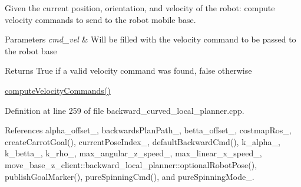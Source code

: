 Given the current position, orientation, and velocity of the robot\+: compute velocity commands to send to the robot mobile base. 


\begin{DoxyParams}{Parameters}
{\em cmd\+\_\+vel} & Will be filled with the velocity command to be passed to the robot base \\
\hline
\end{DoxyParams}
\begin{DoxyReturn}{Returns}
True if a valid velocity command was found, false otherwise
\end{DoxyReturn}
\hyperlink{classmove__base__z__client_1_1backward__local__planner_1_1BackwardLocalPlanner_a8e7dec0bc31856d814d8fa6df747bbb8}{compute\+Velocity\+Commands()} 

Definition at line 259 of file backward\+\_\+curved\+\_\+local\+\_\+planner.\+cpp.



References alpha\+\_\+offset\+\_\+, backwards\+Plan\+Path\+\_\+, betta\+\_\+offset\+\_\+, costmap\+Ros\+\_\+, create\+Carrot\+Goal(), current\+Pose\+Index\+\_\+, default\+Backward\+Cmd(), k\+\_\+alpha\+\_\+, k\+\_\+betta\+\_\+, k\+\_\+rho\+\_\+, max\+\_\+angular\+\_\+z\+\_\+speed\+\_\+, max\+\_\+linear\+\_\+x\+\_\+speed\+\_\+, move\+\_\+base\+\_\+z\+\_\+client\+::backward\+\_\+local\+\_\+planner\+::optional\+Robot\+Pose(), publish\+Goal\+Marker(), pure\+Spinning\+Cmd(), and pure\+Spinning\+Mode\+\_\+.


